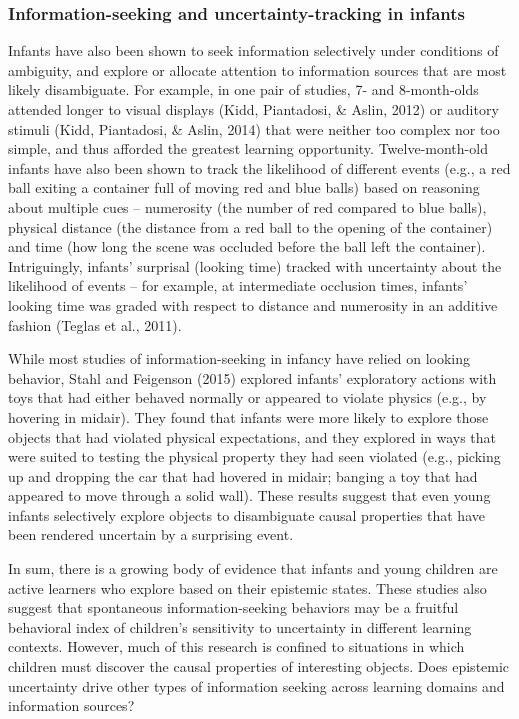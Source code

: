 \documentclass[a4paper,man,apacite,floatsintext]{apa6}
\begin{document}
\subsubsection{Information-seeking and uncertainty-tracking in
infants}\label{information-seeking-and-uncertainty-tracking-in-infants}

Infants have also been shown to seek information selectively under
conditions of ambiguity, and explore or allocate attention to
information sources that are most likely disambiguate. For example, in
one pair of studies, 7- and 8-month-olds attended longer to visual
displays (Kidd, Piantadosi, \& Aslin, 2012) or auditory stimuli (Kidd,
Piantadosi, \& Aslin, 2014) that were neither too complex nor too
simple, and thus afforded the greatest learning opportunity.
Twelve-month-old infants have also been shown to track the likelihood of
different events (e.g., a red ball exiting a container full of moving
red and blue balls) based on reasoning about multiple cues -- numerosity
(the number of red compared to blue balls), physical distance (the
distance from a red ball to the opening of the container) and time (how
long the scene was occluded before the ball left the container).
Intriguingly, infants' surprisal (looking time) tracked with uncertainty
about the likelihood of events -- for example, at intermediate occlusion
times, infants' looking time was graded with respect to distance and
numerosity in an additive fashion (Teglas et al., 2011).

While most studies of information-seeking in infancy have relied on
looking behavior, Stahl and Feigenson (2015) explored infants'
exploratory actions with toys that had either behaved normally or
appeared to violate physics (e.g., by hovering in midair). They found
that infants were more likely to explore those objects that had violated
physical expectations, and they explored in ways that were suited to
testing the physical property they had seen violated (e.g., picking up
and dropping the car that had hovered in midair; banging a toy that had
appeared to move through a solid wall). These results suggest that even
young infants selectively explore objects to disambiguate causal
properties that have been rendered uncertain by a surprising event.

In sum, there is a growing body of evidence that infants and young
children are active learners who explore based on their epistemic
states. These studies also suggest that spontaneous information-seeking
behaviors may be a fruitful behavioral index of children's sensitivity
to uncertainty in different learning contexts. However, much of this
research is confined to situations in which children must discover the
causal properties of interesting objects. Does epistemic uncertainty
drive other types of information seeking across learning domains and
information sources?
\end{document}
